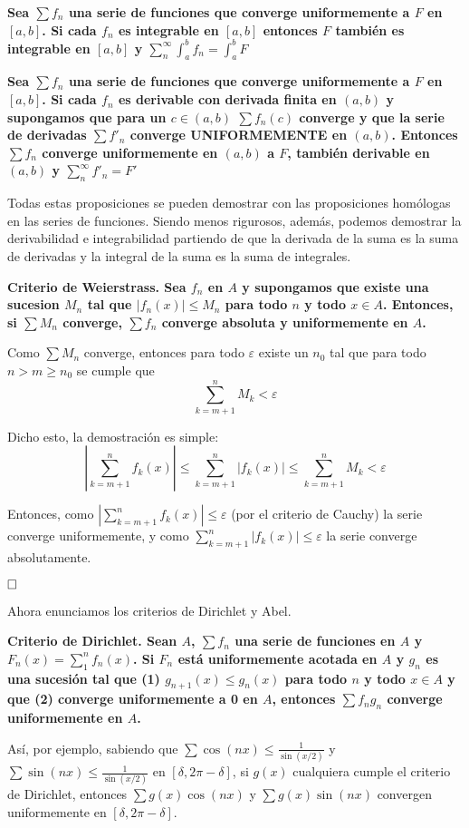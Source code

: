 \documentclass[a4paper]{article}
\newcommand{\qed}{\begin{flushright}
		{$\newline\square$}
	\end{flushright}}
\begin{document}
\textbf{Sea $\sum f_n$ una serie de funciones que converge uniformemente a $F$ en $[a,b]$. Si cada $f_n$ es integrable en $[a,b]$ entonces $F$ también es integrable en $[a,b]$ y $\sum_n^\infty\int_a^bf_n = \int_a^bF$ }

\textbf{Sea $\sum f_n$ una serie de funciones que converge uniformemente a $F$ en $[a,b]$. Si cada $f_n$ es derivable con derivada finita en $(a,b)$ y supongamos que para un $c\in(a,b)$ $\sum f_n(c)$ converge y que la serie de derivadas $\sum f'_n$ converge UNIFORMEMENTE en $(a,b)$. Entonces $\sum f_n$ converge uniformemente en $(a,b)$ a $F$, también derivable en $(a,b)$ y $\sum_n^\infty f'_n = F'$ }

Todas estas proposiciones se pueden demostrar con las proposiciones homólogas en las series de funciones. Siendo menos rigurosos, además, podemos demostrar la derivabilidad e integrabilidad partiendo de que la derivada de la suma es la suma de derivadas y la integral de la suma es la suma de integrales.

\textbf{Criterio de Weierstrass. Sea $f_n$ en $A$ y supongamos que existe una sucesion $M_n$ tal que $|f_n(x)| \le M_n$ para todo $n$ y todo $x\in A$. Entonces, si $\sum M_n$ converge, $\sum f_n$ converge absoluta y uniformemente en $A$.}

Como $\sum M_n$ converge, entonces para todo $\varepsilon$ existe un $n_0$ tal que para todo $n>m\ge n_0$ se cumple que 
$$\sum_{k = m+1}^n M_k < \varepsilon$$

Dicho esto, la demostración es simple:
$$\left| \sum^n_{k = m+1} f_k(x) \right| \le \sum^n_{k = m+1}\left|  f_k(x) \right| \le\sum_{k = m+1}^n M_k < \varepsilon$$

Entonces, como $\left| \sum^n_{k = m+1} f_k(x) \right| \le \varepsilon$ (por el criterio de Cauchy) la serie converge uniformemente, y como $\sum^n_{k = m+1}\left|  f_k(x) \right| \le \varepsilon$ la serie converge absolutamente.\qed

Ahora enunciamos los criterios de Dirichlet y Abel.

\textbf{Criterio de Dirichlet. Sean $A$, $\sum f_n$ una serie de funciones en $A$ y $F_n(x) = \sum_1^n f_n(x)$. Si $F_n$ está uniformemente acotada en $A$ y $g_n$ es una sucesión tal que (1) $g_{n+1}(x) \le g_{n}(x)$ para todo $n$ y todo $x\in A$ y que (2) converge uniformemente a 0 en $A$, entonces $\sum f_ng_n$ converge uniformemente en $A$.}

Así, por ejemplo, sabiendo que $\sum \cos(nx) \le \frac{1}{\sin(x/2)}$ y $\sum \sin(nx) \le \frac{1}{\sin(x/2)}$ en $[\delta, 2\pi-\delta]$, si $g(x)$ cualquiera cumple el criterio de Dirichlet, entonces $\sum g(x)\cos (nx)$ y $\sum g(x) \sin(nx)$ convergen uniformemente en $[\delta, 2\pi-\delta]$.
\end{document}
